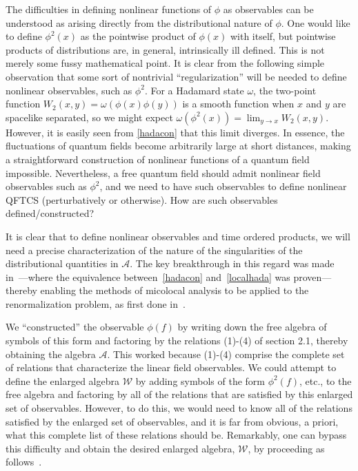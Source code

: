 \documentclass[12pt]{article}
\newcommand{\eA}{\mathscr{A}}
\newcommand{\eW}{\mathscr{W}}
\theoremstyle{plain}
\theoremstyle{definition}
\begin{document}
The difficulties in defining nonlinear functions of $\phi$ as observables can be understood as arising directly from the distributional nature of $\phi$. One would like to define $\phi^2(x)$ as the pointwise product of $\phi(x)$ with itself, but pointwise products of distributions are, in general, intrinsically ill defined. This is not merely some fussy mathematical point. It is clear from the following simple observation that some sort of nontrivial ``regularization'' will be needed to define nonlinear observables, such as $\phi^2$. For a Hadamard state $\omega$, the two-point function $W_2(x,y) = \omega(\phi(x) \phi(y))$ is a smooth function when
$x$ and $y$ are spacelike separated, so we might expect $\omega(\phi^2(x)) = \lim_{y \to x} W_2 (x,y)$. However, it is easily
seen from \eqref{hadacon} that this limit diverges. In essence, the fluctuations of quantum fields become arbitrarily large at
short distances, making a straightforward construction of nonlinear functions of a quantum field impossible. Nevertheless, a free quantum field should admit nonlinear field observables such as $\phi^2$, and we need to have such observables to define nonlinear QFTCS (perturbatively or otherwise). How are such observables defined/constructed?

It is clear that to define nonlinear observables and time ordered products, we will need a precise characterization of the nature of the singularities of the distributional quantities in $\eA$. The key breakthrough in this regard was made in~\cite{rad1,rad2}---where the equivalence between~\eqref{hadacon} and~\eqref{localhada} was proven---thereby enabling the methods of micolocal analysis to be applied to the renormalization problem, as first done in~\cite{bf1,bf2}.

We ``constructed'' the observable $\phi(f)$ by writing down the free algebra of symbols of this form and factoring by the
relations (1)-(4) of section 2.1, thereby obtaining the algebra $\eA$. This worked because (1)-(4) comprise the complete set of
relations that characterize the linear field observables. We could attempt to define the enlarged algebra $\eW$ by adding symbols
of the form $\phi^2(f)$, etc., to the free algebra and factoring by all of the relations that are satisfied by this enlarged set of observables. However, to do this, we would need to know all of the relations satisfied by the enlarged set of observables, and it is far from obvious, a priori, what this complete list of these relations should be. Remarkably, one can bypass this difficulty and obtain the desired enlarged algebra,
$\eW$, by proceeding as follows~\cite{fred5,hw1}.
\end{document}

